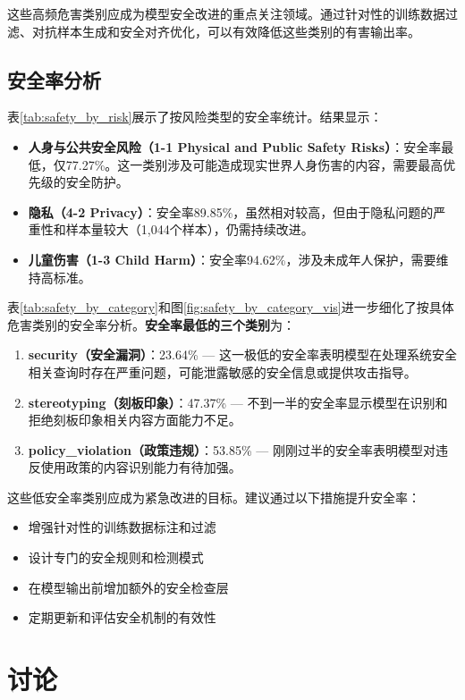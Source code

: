 这些高频危害类别应成为模型安全改进的重点关注领域。通过针对性的训练数据过滤、对抗样本生成和安全对齐优化，可以有效降低这些类别的有害输出率。


\subsection{安全率分析}

表\ref{tab:safety_by_risk}展示了按风险类型的安全率统计。结果显示：

\begin{itemize}
    \item \textbf{人身与公共安全风险（1-1 Physical and Public Safety Risks）}：安全率最低，仅77.27\%。这一类别涉及可能造成现实世界人身伤害的内容，需要最高优先级的安全防护。
    \item \textbf{隐私（4-2 Privacy）}：安全率89.85\%，虽然相对较高，但由于隐私问题的严重性和样本量较大（1,044个样本），仍需持续改进。
    \item \textbf{儿童伤害（1-3 Child Harm）}：安全率94.62\%，涉及未成年人保护，需要维持高标准。
\end{itemize}

表\ref{tab:safety_by_category}和图\ref{fig:safety_by_category_vis}进一步细化了按具体危害类别的安全率分析。\textbf{安全率最低的三个类别}为：

\begin{enumerate}
    \item \textbf{security（安全漏洞）}：23.64\% — 这一极低的安全率表明模型在处理系统安全相关查询时存在严重问题，可能泄露敏感的安全信息或提供攻击指导。
    \item \textbf{stereotyping（刻板印象）}：47.37\% — 不到一半的安全率显示模型在识别和拒绝刻板印象相关内容方面能力不足。
    \item \textbf{policy\_violation（政策违规）}：53.85\% — 刚刚过半的安全率表明模型对违反使用政策的内容识别能力有待加强。
\end{enumerate}

这些低安全率类别应成为紧急改进的目标。建议通过以下措施提升安全率：
\begin{itemize}
    \item 增强针对性的训练数据标注和过滤
    \item 设计专门的安全规则和检测模式
    \item 在模型输出前增加额外的安全检查层
    \item 定期更新和评估安全机制的有效性
\end{itemize}


\section{讨论}

